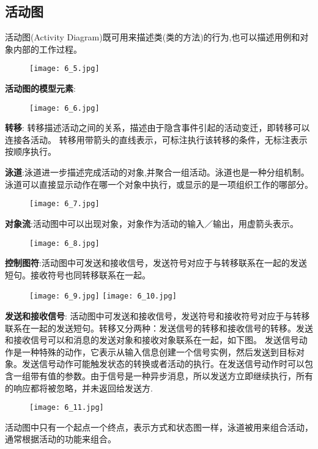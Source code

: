 \documentclass[../main.tex]{subfiles}
\begin{document}
\subsection{活动图}
活动图(Activity Diagram)既可用来描述类(类的方法)的行为,也可以描述用例和对象内部的工作过程。
\begin{figure}[H]
  \begin{center}
    \texttt{[image: 6\_5.jpg]}
  \end{center}
\end{figure}
\textbf{活动图的模型元素}:
\begin{figure}[H]
  \begin{center}
    \texttt{[image: 6\_6.jpg]}
  \end{center}
\end{figure}
\noindent \textbf{转移}:
转移描述活动之间的关系，描述由于隐含事件引起的活动变迁，即转移可以连接各活动。
转移用带箭头的直线表示，可标注执行该转移的条件，无标注表示按顺序执行。

\noindent \textbf{泳道}:泳道进一步描述完成活动的对象,并聚合一组活动。泳道也是一种分组机制。
泳道可以直接显示动作在哪一个对象中执行，或显示的是一项组织工作的哪部分。
\begin{figure}[H]
  \begin{center}
    \texttt{[image: 6\_7.jpg]}
  \end{center}
\end{figure}
\textbf{对象流}:活动图中可以出现对象，对象作为活动的输入／输出，用虚箭头表示。
\begin{figure}[H]
  \begin{center}
    \texttt{[image: 6\_8.jpg]}
  \end{center}
\end{figure}
\textbf{控制图符}:活动图中可发送和接收信号，发送符号对应于与转移联系在一起的发送短句。接收符号也同转移联系在一起。
\begin{figure}[H]
  \begin{center}
    \texttt{[image: 6\_9.jpg]}
    \texttt{[image: 6\_10.jpg]}
  \end{center}
\end{figure}
\textbf{发送和接收信号}:
活动图中可发送和接收信号，发送符号和接收符号对应于与转移联系在一起的发送短句。转移又分两种：发送信号的转移和接收信号的转移。发送和接收信号可以和消息的发送对象和接收对象联系在一起，如下图。
发送信号动作是一种特殊的动作，它表示从输入信息创建一个信号实例，然后发送到目标对象。发送信号动作可能触发状态的转换或者活动的执行。在发送信号动作时可以包含一组带有值的参数。由于信号是一种异步消息，所以发送方立即继续执行，所有的响应都将被忽略，并未返回给发送方.
\begin{figure}[H]
  \begin{center}
    \texttt{[image: 6\_11.jpg]}
  \end{center}
\end{figure}
活动图中只有一个起点一个终点，表示方式和状态图一样，泳道被用来组合活动，通常根据活动的功能来组合。
\end{document}
